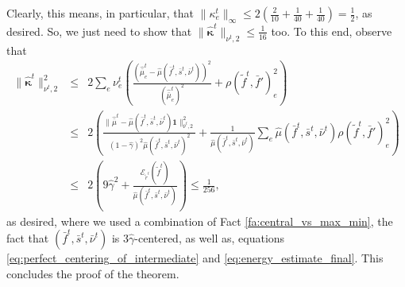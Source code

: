 \documentclass[11pt, letterpaper]{article}
\newcommand{\onev}{\mathbf{1}}
\newcommand{\norm}[2]{\|#1\|_{#2}}
\newcommand{\inorm}[1]{\|#1\|_{\infty}}
\newcommand{\energy}[2]{\mathcal{E}_{#1}(#2)}
\newcommand{\hmu}{\hat{\mu}}
\newcommand{\ohmu}{\hat{\bar{\mu}}}
\newcommand{\hgamma}{\hat{\gamma}}
\newcommand{\vnu}{\boldsymbol{\mathit{\nu}}}
\newcommand{\ovnu}{\boldsymbol{\bar{\mathit{\nu}}}}
\newcommand{\ohvmu}{\boldsymbol{\mathit{\hat{\bar{\mu}}}}}
\newcommand{\hvkappa}{\boldsymbol{\hat{\kappa}}}
\newcommand{\tff}{\boldsymbol{\mathit{\tilde{f}}}}
\newcommand{\off}{\boldsymbol{\mathit{\bar{f}}}}
\newcommand{\trr}{\boldsymbol{\mathit{\tilde{r}}}}
\newcommand{\oss}{\boldsymbol{\bar{\mathit{s}}}}
\begin{document}
Clearly, this means, in particular, that $\inorm{\kappa_e^t}\leq 2(\frac{2}{10}+\frac{1}{40}+\frac{1}{40})=\frac{1}{2}$, as desired. So, we just need to show that $\norm{\hvkappa^t}{\vnu^t,2}\leq \frac{1}{16}$ too. To this end, observe that
\begin{eqnarray*}
\norm{\hvkappa^t}{\vnu^t,2}^2 &\leq& 2 \sum_{e} \nu_e^t \left(\frac{(\ohmu_e^t-\hmu(\off^t,\oss^t,\ovnu^t))^2}{(\ohmu_e^t)^2} + \rho(\tff^t,\off')_e^2\right) \\
&\leq& 2\left( \frac{\norm{\ohvmu^t-\hmu(\off^t,\oss^t,\ovnu^t)\onev}{\ovnu^t,2}^2}{(1-\hgamma)^2\hmu(\off^t,\oss^t,\ovnu^t)^2} + \frac{1}{\hmu(\off^t,\oss^t,\ovnu^t)} \sum_e \hmu(\off^t,\oss^t,\ovnu^t) \rho(\tff^t,\off')_e^2\right)\\
&\leq & 2 \left(9 \hgamma^2 + \frac{\energy{\trr^t}{\tff^t}}{\hmu(\off^t,\oss^t,\ovnu^t)} \right) \leq \frac{1}{256},
\end{eqnarray*}
as desired, where we used a combination of Fact \ref{fa:central_vs_max_min}, the fact that $(\off^t,\oss^t,\ovnu^t)$ is $3\hgamma$-centered, as well as, equations \eqref{eq:perfect_centering_of_intermediate} and  \eqref{eq:energy_estimate_final}.
This concludes the proof of the theorem. 
\end{document}
